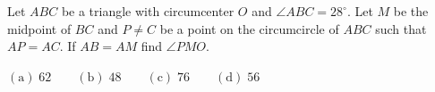 Let $ABC$ be a triangle with circumcenter $O$ and $\angle ABC = 28^{\circ}$. Let $M$ be the midpoint of $BC$ and $P \neq C$ be a point on the circumcircle of $ABC$ such that $AP = AC$. If $AB = AM$ find $\angle PMO$.



$\mathrm{(a)}\; 62 \qquad \mathrm{(b)}\; 48 \qquad \mathrm{(c)}\; 76 \qquad \mathrm{(d)}\; 56$
